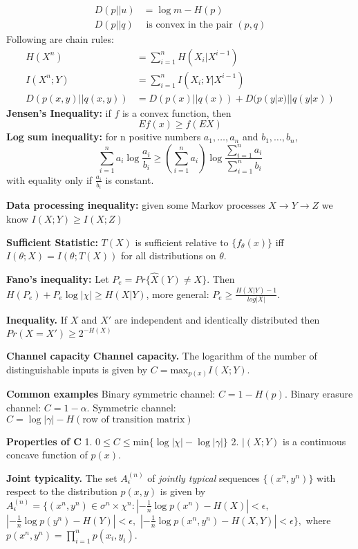 \documentclass[10pt]{article}
\begin{document}
\begin{tiny}
\begin{multicols}{3}
\begin{align}
D(p||u)&=\log m - H(p)\label{eq:chimu}\\
D(p||q)&\text{ is convex in the pair }(p,q)
\end{align}
Following are chain rules:
\begin{align}
H(X^n)&=\sum_{i=1}^n H(X_i|X^{i-1})\\
I(X^n;Y)&=\sum_{i=1}^n I(X_i;Y|X^{i-1})\\
D(p(x,y)||q(x,y))&=D(p(x)||q(x)) + D(p(y|x)||q(y|x))
\end{align}
{\bf Jensen's Inequality:} if $f$ is a convex function, then
\begin{equation}
Ef(x) \geq f(EX)
\end{equation}
{\bf Log sum inequality:} for n positive numbers $a_1,\ldots,a_n$ and $b_1,\ldots,b_n$,
\begin{equation}
\sum_{i=1}^n a_i \log \frac{a_i}{b_i} \geq \left( \sum_{i=1}^n a_i \right) \log \frac{\sum_{i=1}^n a_i}{\sum_{i=1}^n b_i}
\end{equation}
with equality only if $\frac{a_i}{b_i}$ is constant. 

{\bf Data processing inequality:} given some Markov processes $X\rightarrow Y\rightarrow Z$ we know $I(X;Y)\geq I(X;Z)$

{\bf Sufficient Statistic:} $T(X)$ is sufficient relative to $\{f_\theta (x)\}$ iff $I(\theta;X)=I(\theta;T(X))$ for all distributions on $\theta$.

{\bf Fano's inequality:} Let $P_e=Pr\{\hat{X}(Y)\neq X\}$. Then $H(P_e)+P_e \log |\chi| \geq H(X|Y)$, more general: $P_e \geq \frac{H(X|Y)-1}{log|X|}$.

{\bf Inequality.} If $X$ and $X'$ are independent and identically distributed then $Pr(X=X') \geq 2^{-H(X)}$


\textbf{\scriptsize Channel capacity}
{\bf Channel capacity.} The logarithm of the number of distinguishable inputs is given by $ C= \text{max}_{p(x)} I(X;Y).$

{\bf Common examples} Binary symmetric channel: $C= 1 - H(p)$. Binary erasure channel: $C = 1 - \alpha$. Symmetric channel: $C= \log |\gamma | - H(\text{row of transition matrix})$

{\bf Properties of C}  1. $0 \leq C \leq \text{min}\{\log |\chi| - \log | \gamma | \}$  2. $|(X;Y)$ is a continuous concave function of $p(x)$.

{\bf Joint typicality.}  The set $A_{\epsilon}^{(n)}$ of {\it jointly typical} sequences $\{(x^{n},y^{n})\}$ with respect to the distribution $p(x,y)$ is given by $A_{\epsilon}^{(n)} = \{ (x^{n},y^{n}) \in \sigma^{n} \times \chi^{n}: \left| -\frac{1}{n}\log p(x^{n}) - H(X) \right| < \epsilon, $ $\left| -\frac{1}{n}\log p(y^{n}) - H(Y) \right| <\epsilon, $ $\left| -\frac{1}{n} \log p(x^{n},y^{n})-H(X,Y) \right| <\epsilon \}, $ where $p(x^{n},y^{n}) = \prod_{i=1}^{n}p(x_{i},y_{i}).$



\end{multicols}
\end{tiny}
\end{document}
